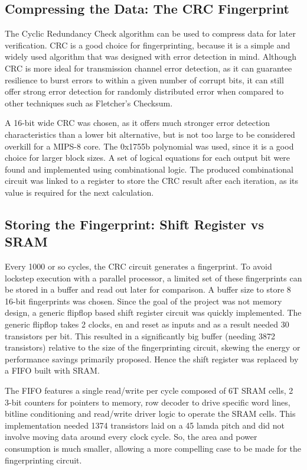 \documentclass[10pt,journal,compsoc]{IEEEtran}
\begin{document}
\subsection{Compressing the Data: The CRC Fingerprint}

The Cyclic Redundancy Check algorithm can be used to compress data for later verification. CRC is a good choice for fingerprinting, because it is a simple and widely used algorithm that was designed with error detection in mind. Although CRC is more ideal for transmission channel error detection, as it can guarantee resilience to burst errors to within a given number of corrupt bits, it can still offer strong error detection for randomly distributed error when compared to other techniques such as Fletcher's Checksum.\

A 16-bit wide CRC was chosen, as it offers much stronger error detection characteristics than a lower bit alternative, but is not too large to be considered overkill for a MIPS-8 core. The 0x1755b polynomial was used, since it is a good choice for larger block sizes\cite{Koopman}. A set of logical equations for each output bit were found\cite{Parcrc} and implemented using combinational logic. The produced combinational circuit was linked to a register to store the CRC result after each iteration, as its value is required for the next calculation. 


\subsection{Storing the Fingerprint: Shift Register vs SRAM}
Every 1000 or so cycles, the CRC circuit generates a fingerprint. To avoid lockstep execution with a parallel processor, a limited set of these fingerprints can be stored in a buffer and read out later for comparison. A buffer size to store 8 16-bit fingerprints was chosen. Since the goal of the project was not memory design, a generic flipflop based shift register circuit was quickly implemented. The generic flipflop takes 2 clocks, en and reset as inputs and as a result needed 30 transistors per bit. This resulted in a significantly big buffer (needing 3872 transistors) relative to the size of the fingerprinting circuit, skewing the energy or performance savings primarily proposed. Hence the shift register was replaced by a FIFO built with SRAM. 

The FIFO features a single read/write per cycle composed of 6T SRAM cells, 2 3-bit counters for pointers to memory, row decoder to drive specific word lines, bitline conditioning and read/write driver logic to operate the SRAM cells. This implementation needed 1374 transistors laid on a 45 lamda pitch and did not involve moving data around every clock cycle. So, the area and power consumption is much smaller, allowing a more compelling case to be made for the fingerprinting circuit. 
\end{document}

